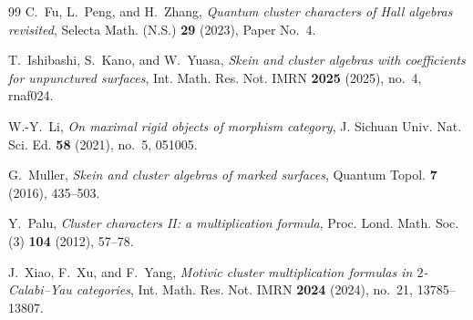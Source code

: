 \begin{thebibliography}{99}
C.~Fu, L.~Peng, and H.~Zhang,
\emph{Quantum cluster characters of Hall algebras revisited},
Selecta Math. (N.S.) \textbf{29} (2023), Paper No.~4.

T.~Ishibashi, S.~Kano, and W.~Yuasa,
\emph{Skein and cluster algebras with coefficients for unpunctured surfaces},
Int. Math. Res. Not. IMRN \textbf{2025} (2025), no.~4, rnaf024.

W.-Y.~Li,
\emph{On maximal rigid objects of morphism category},
J. Sichuan Univ. Nat. Sci. Ed. \textbf{58} (2021), no.~5, 051005.

G.~Muller,
\emph{Skein and cluster algebras of marked surfaces},
Quantum Topol. \textbf{7} (2016), 435--503.

Y.~Palu,
\emph{Cluster characters II: a multiplication formula},
Proc. Lond. Math. Soc. (3) \textbf{104} (2012), 57--78.

J.~Xiao, F.~Xu, and F.~Yang,
\emph{Motivic cluster multiplication formulas in $2$-Calabi--Yau categories},
Int. Math. Res. Not. IMRN \textbf{2024} (2024), no.~21, 13785--13807.

\end{thebibliography}
